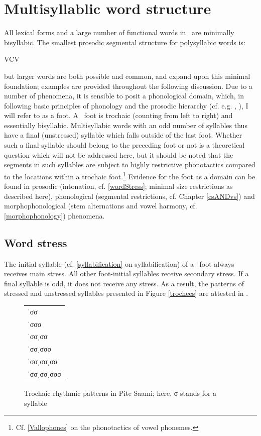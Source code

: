 \section{Multisyllablic word structure}\label{polysyllabicWords}
All lexical forms and a large number of functional words in \PS\ are minimally bisyllabic. The smallest prosodic segmental structure for polysyllabic words is: \begin{center}VCV\end{center} but larger words are both possible and common, and expand upon this minimal foundation; examples are provided throughout the following discussion. Due to a number of phenomena, it is sensible to posit a phonological domain, which, in following basic principles of phonology %
and the prosodic hierarchy %
(cf. e.g. \citet[280-283]{dixon2010a}, \citet{Selkirk1980,Hayes1989,NesporVogel1986}), I will refer to as a {foot}. A \PS\ foot is trochaic (counting from left to right) and essentially bisyllabic. Multisyllabic words with an odd number of syllables thus have a final (unstressed) syllable which falls outside of the last foot. 
Whether such a final syllable should belong to the preceding foot or not is a theoretical question which will not be addressed here, but it should be noted that the segments in such syllables are subject to highly restrictive phonotactics compared to the locations within a trochaic foot.\footnote{Cf. \SEC\ref{Vallophones} on the phonotactics of vowel phonemes.} 
Evidence for the foot as a domain can be found in prosodic (intonation, cf. \SEC\ref{wordStress}; minimal size restrictions as described here), phonological (segmental restrictions, cf. Chapter \ref{csANDvs}) and morphophonological (stem alternations and vowel harmony, cf. \SEC\ref{morphophonology}) phenomena. 



\subsection{Word stress}\label{wordStress}
The initial syllable (cf. \SEC\ref{syllabification} on syllabification) of a \PS\ foot always receives main stress. All other foot-initial syllables receive secondary stress. If a final syllable is odd, it does not receive any stress. As a result, the patterns of stressed and unstressed syllables presented in Figure \vref{trochees} are attested in \PS. 
\begin{figure}
\centering
\begin{tabular}{l}
ˈσσ \\
ˈσσσ \\
ˈσσˌσσ \\
ˈσσˌσσσ \\
ˈσσˌσσˌσσ \\
ˈσσˌσσˌσσσ \\
\end{tabular}
\caption[Trochaic rhythmic patterns in Pite Saami]{Trochaic rhythmic patterns in Pite Saami; here, σ stands for a syllable}\label{trochees}
\end{figure}

